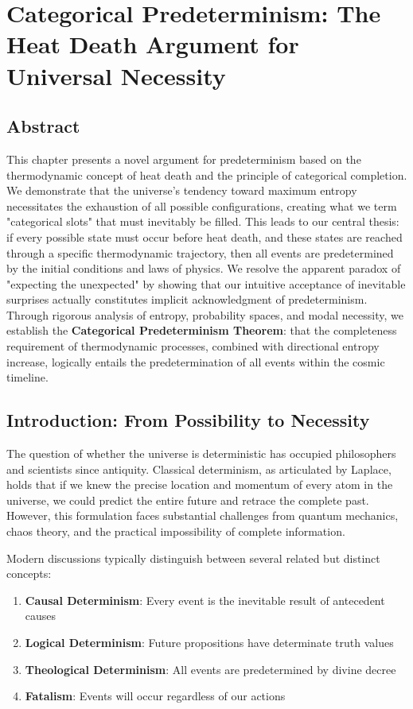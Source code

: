 \documentclass[12pt,a4paper]{article}
\theoremstyle{definition}
\begin{document}
{\section{Categorical Predeterminism: The Heat Death Argument for Universal Necessity}

\subsection{Abstract}

This chapter presents a novel argument for predeterminism based on the thermodynamic concept of heat death and the principle of categorical completion. We demonstrate that the universe's tendency toward maximum entropy necessitates the exhaustion of all possible configurations, creating what we term "categorical slots" that must inevitably be filled. This leads to our central thesis: if every possible state must occur before heat death, and these states are reached through a specific thermodynamic trajectory, then all events are predetermined by the initial conditions and laws of physics. We resolve the apparent paradox of "expecting the unexpected" by showing that our intuitive acceptance of inevitable surprises actually constitutes implicit acknowledgment of predeterminism. Through rigorous analysis of entropy, probability spaces, and modal necessity, we establish the \textbf{Categorical Predeterminism Theorem}: that the completeness requirement of thermodynamic processes, combined with directional entropy increase, logically entails the predetermination of all events within the cosmic timeline.

\subsection{Introduction: From Possibility to Necessity}

The question of whether the universe is deterministic has occupied philosophers and scientists since antiquity. Classical determinism, as articulated by Laplace, holds that if we knew the precise location and momentum of every atom in the universe, we could predict the entire future and retrace the complete past. However, this formulation faces substantial challenges from quantum mechanics, chaos theory, and the practical impossibility of complete information.

Modern discussions typically distinguish between several related but distinct concepts:

\begin{enumerate}
\item \textbf{Causal Determinism}: Every event is the inevitable result of antecedent causes
\item \textbf{Logical Determinism}: Future propositions have determinate truth values
\item \textbf{Theological Determinism}: All events are predetermined by divine decree
\item \textbf{Fatalism}: Events will occur regardless of our actions
\end{enumerate}

}
\end{document}
